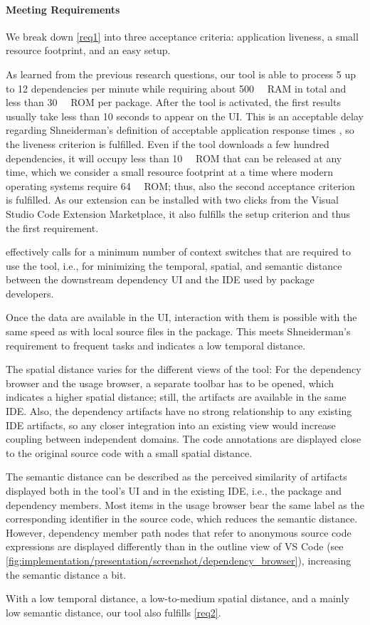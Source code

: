\paragraph{Meeting Requirements}

We break down \cref{req1} into three acceptance criteria: application liveness, a small resource footprint, and an easy setup.

As learned from the previous research questions, our tool is able to process 5 up to 12 dependencies per minute while requiring about \SI{500}{\mega\byte} RAM in total and less than \SI{30}{\mega\byte} ROM per package.
After the tool is activated, the first results usually take less than 10 seconds to appear on the UI.
This is an acceptable delay regarding Shneiderman's definition of acceptable application response times \citep{shneiderman2010designing}, so the liveness criterion is fulfilled.
Even if the tool downloads a few hundred dependencies, it will occupy less than \SI{10}{\giga\byte} ROM that can be released at any time, which we consider a small resource footprint at a time where modern operating systems require \SI{64}{\giga\byte} ROM; thus, also the second acceptance criterion is fulfilled.
As our extension can be installed with two clicks from the Visual Studio Code Extension Marketplace, it also fulfills the setup criterion and thus the first requirement.

 effectively calls for a minimum number of context switches that are required to use the tool, i.e., for minimizing the temporal, spatial, and semantic distance \citep{ungar1997debugging} between the downstream dependency UI and the IDE used by package developers.

Once the data are available in the UI, interaction with them is possible with the same speed as with local source files in the package.
This meets Shneiderman's requirement to frequent tasks and indicates a low temporal distance.

The spatial distance varies for the different views of the tool:
For the dependency browser and the usage browser, a separate toolbar has to be opened, which indicates a higher spatial distance; still, the artifacts are available in the same IDE.
Also, the dependency artifacts have no strong relationship to any existing IDE artifacts, so any closer integration into an existing view would increase coupling between independent domains.
The code annotations are displayed close to the original source code with a small spatial distance.

The semantic distance can be described as the perceived similarity of artifacts displayed both in the tool's UI and in the existing IDE, i.e., the package and dependency members.
Most items in the usage browser bear the same label as the corresponding identifier in the source code, which reduces the semantic distance.
However, dependency member path nodes that refer to anonymous source code expressions are displayed differently than in the outline view of VS Code (see \cref{fig:implementation/presentation/screenshot/dependency_browser}), increasing the semantic distance a bit.

With a low temporal distance, a low-to-medium spatial distance, and a mainly low semantic distance, our tool also fulfills \cref{req2}.
